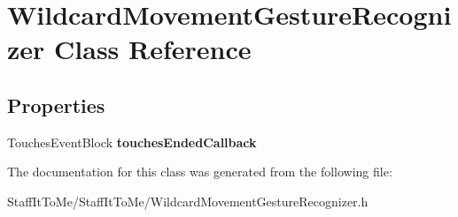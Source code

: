 \hypertarget{interface_wildcard_movement_gesture_recognizer}{
\section{\-Wildcard\-Movement\-Gesture\-Recognizer \-Class \-Reference}
\label{interface_wildcard_movement_gesture_recognizer}
}
\subsection*{\-Properties}
\begin{DoxyCompactItemize}
\item 
\hypertarget{interface_wildcard_movement_gesture_recognizer_a00771a3cd8053f4cbe455a41a1453ce9}{
\-Touches\-Event\-Block {\bfseries touches\-Ended\-Callback}}
\label{interface_wildcard_movement_gesture_recognizer_a00771a3cd8053f4cbe455a41a1453ce9}

\end{DoxyCompactItemize}


\-The documentation for this class was generated from the following file\-:\begin{DoxyCompactItemize}
\item 
\-Staff\-It\-To\-Me/\-Staff\-It\-To\-Me/\-Wildcard\-Movement\-Gesture\-Recognizer.\-h\end{DoxyCompactItemize}
